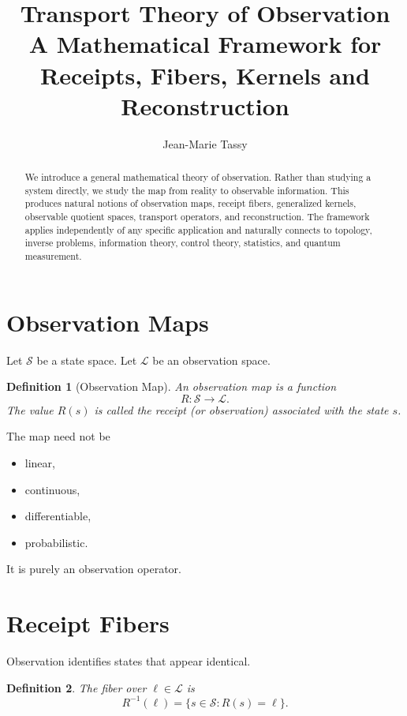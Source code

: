 \documentclass[11pt]{amsart}
\title{Transport Theory of Observation\\
A Mathematical Framework for Receipts, Fibers, Kernels and Reconstruction}
\author{Jean-Marie Tassy}
\newtheorem{definition}{Definition}[section]
\begin{document}
\maketitle

\begin{abstract}
We introduce a general mathematical theory of observation.
Rather than studying a system directly, we study the map from reality to
observable information.
This produces natural notions of
observation maps,
receipt fibers,
generalized kernels,
observable quotient spaces,
transport operators,
and reconstruction.
The framework applies independently of any specific application and naturally
connects to topology, inverse problems, information theory,
control theory, statistics, and quantum measurement.
\end{abstract}

\section{Observation Maps}

Let $\mathcal{S}$ be a state space.
Let $\mathcal{L}$ be an observation space.

\begin{definition}[Observation Map]
An observation map is a function
\[
R: \mathcal{S} \rightarrow \mathcal{L}.
\]
The value $R(s)$ is called the receipt (or observation) associated with
the state $s$.
\end{definition}

The map need not be
\begin{itemize}
\item linear,
\item continuous,
\item differentiable,
\item probabilistic.
\end{itemize}
It is purely an observation operator.

\section{Receipt Fibers}

Observation identifies states that appear identical.

\begin{definition}
The fiber over $\ell \in \mathcal{L}$ is
\[
R^{-1}(\ell)
=
\{ s \in \mathcal{S} : R(s) = \ell \}.
\]
\end{definition}
\end{document}

